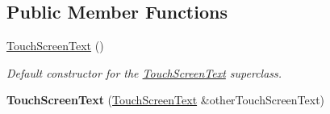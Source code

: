 \subsection*{Public Member Functions}
\begin{DoxyCompactItemize}
\item 
\hypertarget{class_touch_screen_text_ab4eb34ba6e6d41dbcbc00377f497efb8}{\hyperlink{class_touch_screen_text_ab4eb34ba6e6d41dbcbc00377f497efb8}{Touch\+Screen\+Text} ()}\label{class_touch_screen_text_ab4eb34ba6e6d41dbcbc00377f497efb8}

\begin{DoxyCompactList}\small\item\em Default constructor for the \hyperlink{class_touch_screen_text}{Touch\+Screen\+Text} superclass. \end{DoxyCompactList}\item 
\hypertarget{class_touch_screen_text_ab1d335963b16d5c06182002d32b485dc}{{\bfseries Touch\+Screen\+Text} (\hyperlink{class_touch_screen_text}{Touch\+Screen\+Text} \&other\+Touch\+Screen\+Text)}\label{class_touch_screen_text_ab1d335963b16d5c06182002d32b485dc}


\end{DoxyCompactItemize}
